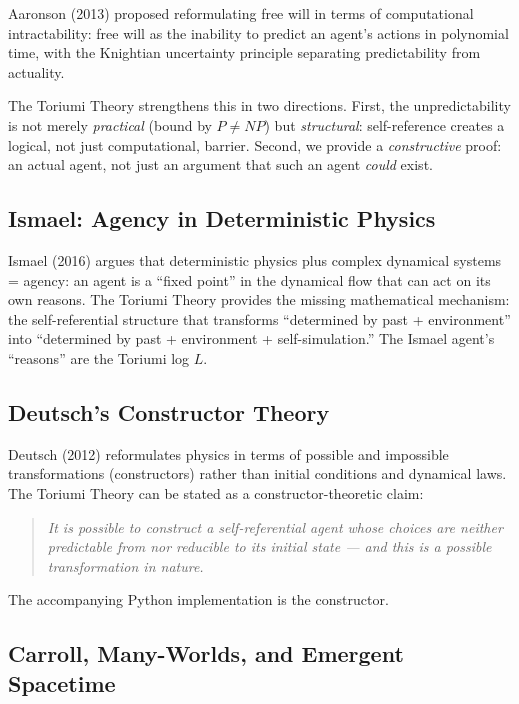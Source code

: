 \documentclass[12pt,a4paper]{article}
\theoremstyle{definition}
\theoremstyle{remark}
\begin{document}
Aaronson (2013) \cite{aaronson2013} proposed reformulating free will in terms
of computational intractability: free will as the inability to predict an
agent's actions in polynomial time, with the Knightian uncertainty principle
separating predictability from actuality.

The Toriumi Theory strengthens this in two directions. First, the
unpredictability is not merely \emph{practical} (bound by $P \neq NP$) but
\emph{structural}: self-reference creates a logical, not just computational,
barrier. Second, we provide a \emph{constructive} proof: an actual agent,
not just an argument that such an agent \emph{could} exist.

\subsection{Ismael: Agency in Deterministic Physics}

Ismael (2016) \cite{ismael2016} argues that deterministic physics plus complex
dynamical systems = agency: an agent is a ``fixed point'' in the dynamical
flow that can act on its own reasons. The Toriumi Theory provides the missing
mathematical mechanism: the self-referential structure that transforms
``determined by past + environment'' into ``determined by past + environment
+ self-simulation.'' The Ismael agent's ``reasons'' are the Toriumi log $L$.

\subsection{Deutsch's Constructor Theory}

Deutsch (2012) \cite{deutsch2012} reformulates physics in terms of possible
and impossible transformations (constructors) rather than initial conditions
and dynamical laws. The Toriumi Theory can be stated as a constructor-theoretic
claim:

\begin{quote}
\textit{It is possible to construct a self-referential agent whose choices
are neither predictable from nor reducible to its initial state --- and this
is a possible transformation in nature.}
\end{quote}

The accompanying Python implementation is the constructor.

\subsection{Carroll, Many-Worlds, and Emergent Spacetime}
\end{document}
